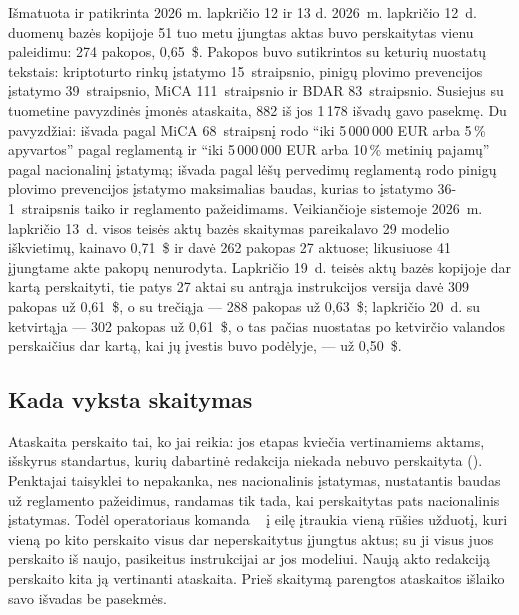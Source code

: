 \begin{lessonbox}{Išmatuota ir patikrinta 2026 m. lapkričio 12 ir 13 d.}
2026~m. lapkričio 12~d. duomenų bazės kopijoje 51 tuo metu įjungtas aktas buvo perskaitytas vienu
paleidimu: 274 pakopos, 0,65~\$. Pakopos buvo sutikrintos su keturių nuostatų tekstais:
kriptoturto rinkų įstatymo 15~straipsnio, pinigų plovimo prevencijos įstatymo 39~straipsnio,
MiCA 111~straipsnio ir BDAR 83~straipsnio. Susiejus su tuometine pavyzdinės įmonės ataskaita,
882 iš jos 1\,178 išvadų gavo pasekmę. Du pavyzdžiai: išvada pagal MiCA 68~straipsnį rodo
\enquote{iki 5\,000\,000 EUR arba 5\,\% apyvartos} pagal reglamentą ir \enquote{iki 5\,000\,000
EUR arba 10\,\% metinių pajamų} pagal nacionalinį įstatymą; išvada pagal lėšų pervedimų
reglamentą rodo pinigų plovimo prevencijos įstatymo maksimalias baudas, kurias to įstatymo
36-1~straipsnis taiko ir reglamento pažeidimams. Veikiančioje sistemoje 2026~m. lapkričio 13~d.
visos teisės aktų bazės skaitymas pareikalavo 29 modelio iškvietimų, kainavo 0,71~\$ ir davė 262
pakopas 27 aktuose; likusiuose 41 įjungtame akte pakopų nenurodyta. Lapkričio 19~d. teisės aktų
bazės kopijoje dar kartą perskaityti, tie patys 27 aktai su antrąja instrukcijos versija davė
309 pakopas už 0,61~\$, o su trečiąja --- 288 pakopas už 0,63~\$; lapkričio 20~d. su ketvirtąja
--- 302 pakopas už 0,61~\$, o tas pačias nuostatas po ketvirčio valandos perskaičius dar kartą,
kai jų įvestis buvo podėlyje, --- už 0,50~\$.
\end{lessonbox}

\subsection{Kada vyksta skaitymas}

Ataskaita perskaito tai, ko jai reikia: jos etapas  kviečia
 vertinamiems aktams, išskyrus standartus, kurių dabartinė redakcija niekada
nebuvo perskaityta (). Penktajai taisyklei to nepakanka, nes
nacionalinis įstatymas, nustatantis baudas už reglamento pažeidimus, randamas tik tada, kai
perskaitytas pats nacionalinis įstatymas. Todėl operatoriaus komanda
~ į eilę įtraukia vieną  rūšies
užduotį, kuri vieną po kito perskaito visus dar neperskaitytus įjungtus aktus; su 
ji visus juos perskaito iš naujo, pasikeitus instrukcijai ar jos modeliui. Naują akto redakciją
perskaito kita ją vertinanti ataskaita. Prieš skaitymą parengtos ataskaitos išlaiko savo išvadas
be pasekmės.

